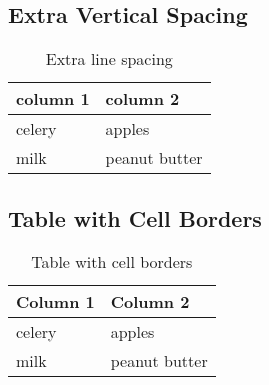 \documentclass[]{scrartcl}
\begin{document}
\subsection{Extra Vertical Spacing}

\begin{table}[h!]
	\renewcommand{\arraystretch}{1.5}
	\centering
	\begin{tabular}{ll}
		column 1 & column 2 \\
		\hline
		celery & apples \\
		milk & peanut butter 
	\end{tabular}
	\caption{Extra line spacing}\label{tab:line-spacing}
\end{table}

\subsection{Table with Cell Borders}

\begin{table}[h!]
	\renewcommand{\arraystretch}{1.2}
	\centering
	\begin{tabular}{|l|l|}
		\hline 
		Column 1 & Column 2 \\
		\hline
		celery & apples \\
		\hline
		milk & peanut butter \\
		\hline
	\end{tabular}
	\caption{Table with cell borders}\label{tab:all-borders}
\end{table}
\end{document}
